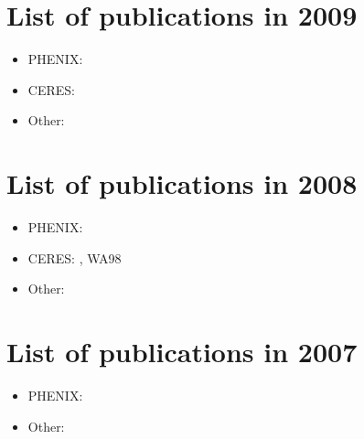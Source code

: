 \documentclass[12pt]{article}
\begin{document}
\section{List of publications in 2009}

\begin{itemize}
\item PHENIX:
\cite{
Afanasiev:2009wq,
Afanasiev:2009aa,
Afanasiev:2009ii,
Adare:2009ic,
Adare:2009vd,
Afanasiev:2009hy,
Adare:2008qb,
Adare:2008aa,
Adare:2008ac,
Rak:2009zz}

\item CERES:
\cite{
Adamova:2009ah,
:2009yd}

\item Other:
\cite{Rak:2009zz}

\end{itemize}


\section{List of publications in 2008}

\begin{itemize}
\item PHENIX:
\cite{
Adare:2007vu,
Adare:2008ns,
:2008cx,
:2008cqb,
Adare:2008qa,
Adare:2008cg,
Adare:2008sh,
Afanasiev:2007kk,
Afanasiev:2007wi,
:2007by}

\item CERES:
\cite{
Adamova:2008hs,
Adamova:2008sx,
:2008rp}, WA98
\cite{Aggarwal:2007gw}

\item Other:
\cite{Kim:2008zz,Rak:2007ky}

\end{itemize}


\section{List of publications in 2007}

\begin{itemize}
\item PHENIX:
\cite{
longPRC:2006sc,
Adler:2005xv,
Adare:2006ti,
:2007xw,
Adare:2007dg,
Adler:2007fj,
Afanasiev:2007tv,
Adler:2006hy,
Adare:2006ns,
Adare:2006nr,
Adare:2006nq,
Adare:2006nn,
Adare:2006kf,
Adler:2006bw,
Adler:2006bv,
Adler:2006wg,
Adler:2006yu,
Adler:2006as}
\item Other:
\cite{Rak:2007qa,Rak:2006zi}

\end{itemize}
\end{document}
